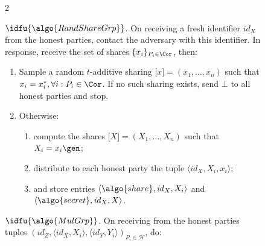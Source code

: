   \begin{figure} \centering \hspace*{-0.05\textwidth}
    \begin{minipage}{1.1\textwidth}

      \begin{framed} \scriptsize


        \begin{multicols}{2}

          {$\idfu{\algo{RandShareGrp}}$.} On receiving a fresh identifier
          $\mathit{id}_{{X}}$ from the honest parties, contact the adversary
          with this identifier. In response, receive the set of shares $\{x_i
          \}_{{P}_i \in \Cor}$, then:

          \begin{enumerate}

            \item Sample a random $t$-additive sharing $\lbrack x\rbrack =
              (x_1, ..., x_n)$ such that $x_i = x^*_i, \forall i : {P}_i \in
              \Cor$. If no such sharing exists, send $\bot$ to all honest
              parties and stop.

            \item Otherwise:

              \begin{enumerate}

                \item compute the shares $\lbrack {X}\rbrack  = ({X}_1, ...,
                  {X}_n)$ such that ${X}_i = x_i\gen$;

                \item distribute to each honest party the tuple $\langle
                  \mathit{id}_{{X}}, X_i, x_i\rangle$;

                \item and store entries $\langle \algo{share},
                  \mathit{id}_{{X}}, {X}_i \rangle$ and $\langle \algo{secret},
                  \mathit{id}_{{X}}, {X} \rangle$.

              \end{enumerate}

          \end{enumerate}

          {$\idfu{\algo{MulGrp}}$.} On receiving from the honest parties tuples
          $(\mathit{id}_{{Z}}, \langle \mathit{id}_{{X}}, {X}_i\rangle, \langle
          \mathit{id}_{{Y}},{Y}_i\rangle)_{{P}_i \in \mathcal{H}}$, do:


\end{multicols}
\end{framed}
\end{minipage}
\end{figure}
